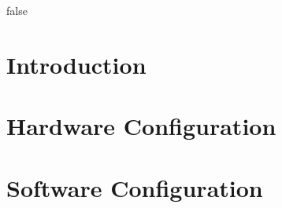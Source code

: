 \documentclass[a4paper,fleqn,english]{book}
\begin{document}

\zusammenfassung%
{false} %
{} %
{} %





\mainmatter%
\pagestyle{fancy}%
\chapter{Introduction}

%
\chapter{Hardware Configuration}

%
\chapter{Software Configuration}

\end{document}
